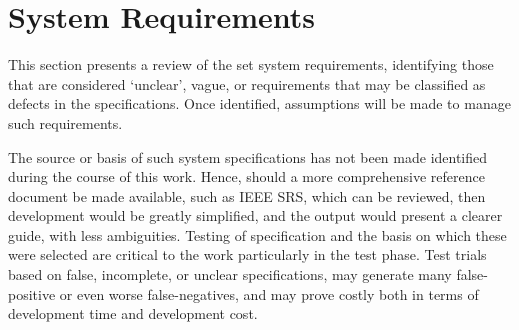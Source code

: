 \section{System Requirements}

This section presents a review of the set system requirements, identifying those that are considered ‘unclear’, vague, or requirements that may be classified as defects in the specifications.  Once identified, assumptions will be made to manage such requirements.
\par
The source or basis of such system specifications has not been made identified during the course of this work.  Hence, should a more comprehensive reference document be made available, such as IEEE SRS, which can be reviewed, then development would be greatly simplified, and the output would present a clearer guide, with less ambiguities. Testing of specification and the basis on which these were selected are critical to the work particularly in the test phase. Test trials based on false, incomplete, or unclear specifications, may generate many false-positive or even worse false-negatives, and may prove costly both in terms of development time and development cost.


